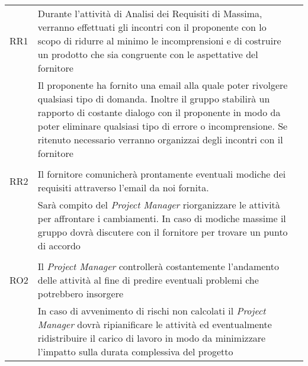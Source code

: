 \begin{table}
\begin{tabular}{l|l|l}
		RR1     & Durante l'attività di Analisi dei Requisiti di Massima, verranno effettuati gli incontri con il proponente con lo scopo di ridurre al minimo le incomprensioni e di costruire un prodotto che sia congruente con le aspettative del fornitore\\  & Il proponente ha fornito una email alla quale poter rivolgere qualsiasi tipo di domanda. Inoltre il gruppo stabilirà un rapporto di costante dialogo con il proponente in modo da poter eliminare qualsiasi tipo di errore o incomprensione. Se ritenuto necessario verranno organizzai degli incontri con il fornitore\\                                                                                                                                                               \\
		RR2     & Il fornitore comunicherà prontamente eventuali modiche dei requisiti attraverso l'email da noi fornita. \\                                                                                                                                       & Sarà compito del \emph{Project Manager} riorganizzare le attività per affrontare i cambiamenti. In caso di modiche massime il gruppo dovrà discutere con il fornitore per trovare un punto di accordo\\                                                                                                                                                                                                                                                                \\
		RO2     & Il \emph{Project Manager} controllerà costantemente l'andamento delle attività al fine di predire eventuali problemi che potrebbero insorgere\\                                                                                   & In caso di avvenimento di rischi non calcolati il \emph{Project Manager} dovrà ripianificare le attività ed eventualmente ridistribuire il carico di lavoro in modo da minimizzare l'impatto sulla durata complessiva del progetto\\                                                                                                                                                                                                                                  
	\end{tabular}
\end{table}





